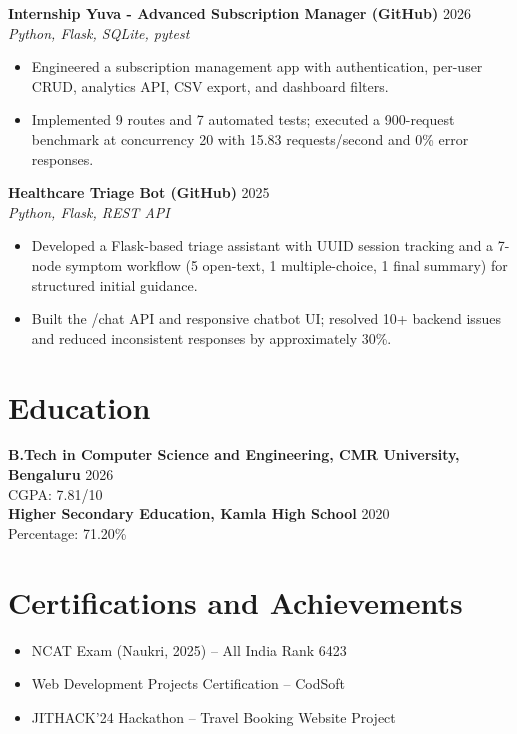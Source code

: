 \documentclass[10pt]{article}
\newcommand{\resheading}[1]{\section*{#1}}
\newcommand{\resitem}[1]{\item #1}
\newcommand{\resproject}[3]{\textbf{#1} \hfill #2\\\textit{#3}}
\begin{document}
\resproject{Internship Yuva - Advanced Subscription Manager (GitHub)}{2026}{Python, Flask, SQLite, pytest}
\begin{itemize}
    \resitem{Engineered a subscription management app with authentication, per-user CRUD, analytics API, CSV export, and dashboard filters.}
    \resitem{Implemented 9 routes and 7 automated tests; executed a 900-request benchmark at concurrency 20 with 15.83 requests/second and 0\% error responses.}
\end{itemize}

\resproject{Healthcare Triage Bot (GitHub)}{2025}{Python, Flask, REST API}
\begin{itemize}
    \resitem{Developed a Flask-based triage assistant with UUID session tracking and a 7-node symptom workflow (5 open-text, 1 multiple-choice, 1 final summary) for structured initial guidance.}
    \resitem{Built the /chat API and responsive chatbot UI; resolved 10+ backend issues and reduced inconsistent responses by approximately 30\%.}
\end{itemize}

\resheading{Education}
\textbf{B.Tech in Computer Science and Engineering, CMR University, Bengaluru} \hfill 2026\\
CGPA: 7.81/10\\
\textbf{Higher Secondary Education, Kamla High School} \hfill 2020\\
Percentage: 71.20\%

\resheading{Certifications and Achievements}
\begin{itemize}
    \resitem{NCAT Exam (Naukri, 2025) -- All India Rank 6423}
    \resitem{Web Development Projects Certification -- CodSoft}
    \resitem{JITHACK'24 Hackathon -- Travel Booking Website Project}
\end{itemize}
\end{document}
